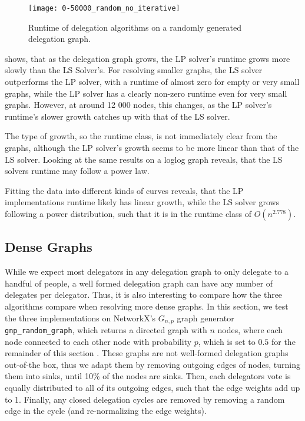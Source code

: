 \begin{figure}[t]
    \centering
    \texttt{[image: 0-50000\_random\_no\_iterative]}
    \caption{Runtime of delegation algorithms on a randomly generated delegation graph.}
    \label{fig:random-large-no-iterative}
\end{figure}

 shows, that as the delegation graph grows, the LP solver's runtime grows more slowly than the LS Solver's. For resolving smaller graphs, the LS solver outperforms the LP solver, with a runtime of almost zero for empty or very small graphs, while the LP solver has a clearly non-zero runtime even for very small graphs. However, at around 12 000 nodes, this changes, as the LP solver's runtime's slower growth catches up with that of the LS solver. 

The type of growth, so the runtime class, is not immediately clear from the graphs, although the LP solver's growth seems to be more linear than that of the LS solver. Looking at the same results on a loglog graph reveals, that the LS solvers runtime may follow a power law.

Fitting the data into different kinds of curves reveals, that the LP implementations runtime likely has linear growth, while the LS solver grows following a power distribution, such that it is in the runtime class of $O(n^{2.778})$.


\subsection{Dense Graphs}

While we expect most delegators in any delegation graph to only delegate to a handful of people, a well formed delegation graph can have any number of delegates per delegator. Thus, it is also interesting to compare how the three algorithms compare when resolving more dense graphs. In this section, we test the three implementations on NetworkX's $G_{n,p}$ graph generator \texttt{gnp\_random\_graph}, which returns a directed graph with $n$ nodes, where each node connected to each other node with probability $p$, which is set to $0.5$ for the remainder of this section \cite{hagbergExploringNetworkStructure2008}. These graphs are not well-formed delegation graphs out-of-the box, thus we adapt them by removing outgoing edges of nodes, turning them into sinks, until 10\% of the nodes are sinks. Then, each delegators vote is equally distributed to all of its outgoing edges, such that the edge weights add up to 1. Finally, any closed delegation cycles are removed by removing a random edge in the cycle (and re-normalizing the edge weights). 

